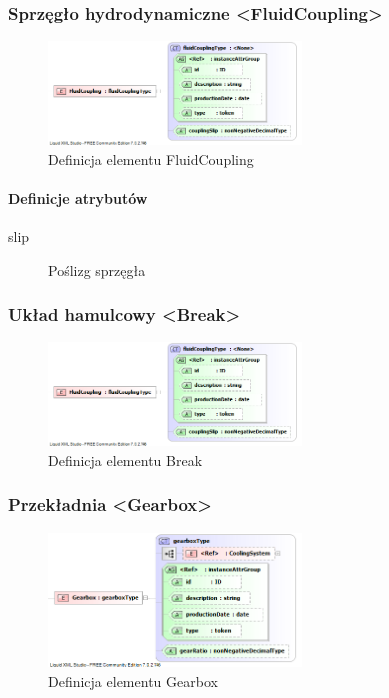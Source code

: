 \documentclass[12pt,a4paper]{article}
\begin{document}
\subsubsection{Sprzęgło hydrodynamiczne <FluidCoupling>}

\begin{figure}[h]
  \centering
  \includegraphics[width=0.6\textwidth]{png/liquid/FluidCoupling}
  \caption{Definicja elementu FluidCoupling}
  \label{fig:fluidCoupling-xsd}
\end{figure}

\paragraph{Definicje atrybutów}
\begin{description}
\item[slip] Poślizg sprzęgła
\end{description}


\subsubsection{Układ hamulcowy <Break>}

\begin{figure}[h]
  \centering
  \includegraphics[width=0.6\textwidth]{png/liquid/FluidCoupling}
  \caption{Definicja elementu Break}
  \label{fig:break-xsd}
\end{figure}


\subsubsection{Przekładnia <Gearbox>}

\begin{figure}[h]
  \centering
  \includegraphics[width=0.6\textwidth]{png/liquid/Gearbox}
  \caption{Definicja elementu Gearbox}
  \label{fig:gearbox-xsd}
\end{figure}
\end{document}

